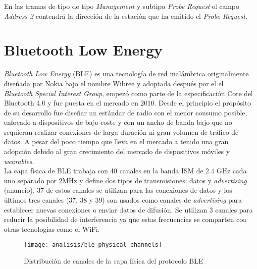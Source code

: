 \documentclass[../proyecto.tex]{subfiles}
\begin{document}
En las tramas de tipo de tipo \textit{Management} y subtipo \textit{Probe Request} el campo \textit{Address 2} contendrá la dirección de la estación que ha emitido el \textit{Probe Request}.\\


\section{Bluetooth Low Energy}

\textit{Bluetooth Low Energy} (BLE) es una tecnología de red inalámbrica originalmente diseñada por Nokia bajo el nombre Wibree y adoptada después por el  el \textit{Bluetooth Special Interest Group}, empezó como parte de la especificación Core del Bluetooth 4.0 y fue puesta en el mercado en 2010. Desde el principio el propósito de su desarrollo fue diseñar un estándar de radio con el menor consumo posible, enfocado a dispositivos de bajo coste y con un ancho de banda bajo que no requieran realizar conexiones de larga duración ni gran volumen de tráfico de datos. A pesar del poco tiempo que lleva en el mercado a tenido una gran adopción debido al gran crecimiento del mercado de dispositivos móviles y \textit{wearables}.\\

La capa física de BLE trabaja con 40 canales en la banda ISM de 2.4 GHz cada uno separado por 2MHz y define dos tipos de transmisiones: datos y \textit{advertising} (anuncio). 37 de estos canales se utilizan para las conexiones de datos y los últimos tres canales (37, 38 y 39) son usados como canales de \textit{advertising} para establecer nuevas conexiones o enviar datos de difusión. Se utilizan 3 canales para reducir la posibilidad de interferencia ya que estas frecuencias se comparten con otras tecnologías como el WiFi.

\begin{figure}[H]
\centering
\texttt{[image: analisis/ble\_physical\_channels]}
\caption{Distribución de canales de la capa física del protocolo BLE \cite{townsend2014getting}}
\label{fig:ble_physical_channels}
\end{figure}
\end{document}
